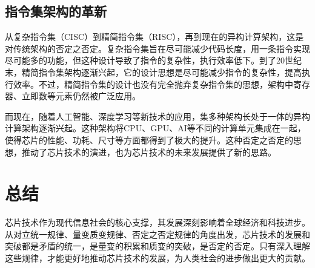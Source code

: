 \documentclass[12pt,hyperref,a4paper,UTF8]{ctexart}
\begin{document}
\subsection{指令集架构的革新}

从复杂指令集（CISC）到精简指令集（RISC），再到现在的异构计算架构，这是对传统架构的否定之否定。复杂指令集旨在尽可能减少代码长度，用一条指令实现尽可能多的功能，但这种设计导致了指令的复杂性，执行效率低下。到了20世纪末，精简指令集架构逐渐兴起，它的设计思想是尽可能减少指令的复杂性，提高执行效率。不过，精简指令集的设计也没有完全抛弃复杂指令集的思想，架构中寄存器、立即数等元素仍然被广泛应用。

而现在，随着人工智能、深度学习等新技术的应用，集多种架构长处于一体的异构计算架构逐渐兴起。这种架构将CPU、GPU、AI等不同的计算单元集成在一起，使得芯片的性能、功耗、尺寸等方面都得到了极大的提升。这种否定之否定的思想，推动了芯片技术的演进，也为芯片技术的未来发展提供了新的思路。

\section{总结}

芯片技术作为现代信息社会的核心支撑，其发展深刻影响着全球经济和科技进步。从对立统一规律、量变质变规律、否定之否定规律的角度出发，芯片技术的发展和突破都是矛盾的统一，是量变的积累和质变的突破，是否定的否定。只有深入理解这些规律，才能更好地推动芯片技术的发展，为人类社会的进步做出更大的贡献。


\end{document}
